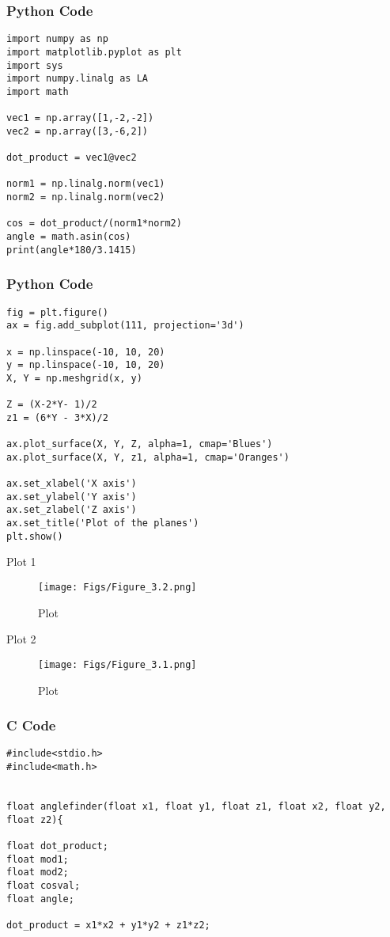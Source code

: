 \documentclass{beamer}
\begin{document}
\begin{frame}[fragile]
    \frametitle{Python Code}
    \begin{lstlisting}
import numpy as np
import matplotlib.pyplot as plt
import sys
import numpy.linalg as LA
import math

vec1 = np.array([1,-2,-2])
vec2 = np.array([3,-6,2])

dot_product = vec1@vec2

norm1 = np.linalg.norm(vec1)
norm2 = np.linalg.norm(vec2)

cos = dot_product/(norm1*norm2)
angle = math.asin(cos)
print(angle*180/3.1415)

\end{lstlisting}
\end{frame}

\begin{frame}[fragile]
    \frametitle{Python Code}

    \begin{lstlisting}
fig = plt.figure()
ax = fig.add_subplot(111, projection='3d')

x = np.linspace(-10, 10, 20)
y = np.linspace(-10, 10, 20)
X, Y = np.meshgrid(x, y)

Z = (X-2*Y- 1)/2
z1 = (6*Y - 3*X)/2

ax.plot_surface(X, Y, Z, alpha=1, cmap='Blues')
ax.plot_surface(X, Y, z1, alpha=1, cmap='Oranges')

ax.set_xlabel('X axis')
ax.set_ylabel('Y axis')
ax.set_zlabel('Z axis')
ax.set_title('Plot of the planes')
plt.show()

    \end{lstlisting}
\end{frame}


\begin{frame}{Plot 1}
\begin{figure}
    \centering
    \texttt{[image: Figs/Figure\_3.2.png]}
    \caption{Plot}
    \label{fig:placeholder}
\end{figure}
\end{frame}

\begin{frame}{Plot 2}
\begin{figure}
    \centering
    \texttt{[image: Figs/Figure\_3.1.png]}
    \caption{Plot}
    \label{fig:placeholder}
\end{figure}
\end{frame}

\begin{frame}[fragile]
\frametitle{C Code}
\begin{lstlisting}
#include<stdio.h>
#include<math.h>


float anglefinder(float x1, float y1, float z1, float x2, float y2, float z2){

float dot_product;
float mod1;
float mod2;
float cosval;
float angle;

dot_product = x1*x2 + y1*y2 + z1*z2;



\end{lstlisting}

\end{frame}
\end{document}

